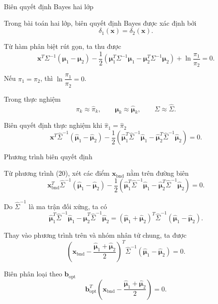 \documentclass{beamer}
\def\bsx{\bm{x}}
\begin{document}
\begin{frame}{Biên quyết định Bayes hai lớp}
	\small
	
	Trong bài toán hai lớp, biên quyết định Bayes được xác định bởi
	\[
	\delta_1(\bsx)=\delta_2(\bsx). \tag{18}
	\]
	
	Từ hàm phân biệt rút gọn, ta thu được
	\[
	\bsx^T\Sigma^{-1}(\bm{\mu}_1-\bm{\mu}_2)
	-\frac{1}{2}
	\left(
	\bm{\mu}_1^T\Sigma^{-1}\bm{\mu}_1
	-
	\bm{\mu}_2^T\Sigma^{-1}\bm{\mu}_2
	\right)
	+
	\ln\frac{\pi_1}{\pi_2}
	=0. \tag{19}
	\]
	
	Nếu \(\pi_1=\pi_2\), thì \(\ln\dfrac{\pi_1}{\pi_2}=0\).
	
	Trong thực nghiệm
	\[
	\pi_k \approx \widehat{\pi}_k,\qquad
	\bm{\mu}_k \approx \widehat{\bm{\mu}}_k,\qquad
	\Sigma \approx \widehat{\Sigma}.
	\]
	
	\begin{block}{Biên quyết định thực nghiệm khi \(\widehat{\pi}_1=\widehat{\pi}_2\)}
		\[
		\bsx^T\widehat{\Sigma}^{-1}
		(\widehat{\bm{\mu}}_1-\widehat{\bm{\mu}}_2)
		-
		\frac{1}{2}
		\left(
		\widehat{\bm{\mu}}_1^T\widehat{\Sigma}^{-1}\widehat{\bm{\mu}}_1
		-
		\widehat{\bm{\mu}}_2^T\widehat{\Sigma}^{-1}\widehat{\bm{\mu}}_2
		\right)
		=0. \tag{20}
		\]
	\end{block}
\end{frame}

\begin{frame}{Phương trình biên quyết định}
	\small
	\setlength{\abovedisplayskip}{2pt}
	\setlength{\belowdisplayskip}{2pt}
	
	Từ phương trình (20), xét các điểm \(\bsx_{\text{bnd}}\) nằm trên đường biên
	\[
	\bsx_{\text{bnd}}^T\widehat{\Sigma}^{-1}(\widehat{\bm{\mu}}_1-\widehat{\bm{\mu}}_2)
	- \frac{1}{2} \left( \widehat{\bm{\mu}}_1^T\widehat{\Sigma}^{-1}\widehat{\bm{\mu}}_1 - \widehat{\bm{\mu}}_2^T\widehat{\Sigma}^{-1}\widehat{\bm{\mu}}_2 \right) = 0.
	\]
	
	Do \(\widehat{\Sigma}^{-1}\) là ma trận đối xứng, ta có
	\[
	\widehat{\bm{\mu}}_1^T\widehat{\Sigma}^{-1}\widehat{\bm{\mu}}_1 - \widehat{\bm{\mu}}_2^T\widehat{\Sigma}^{-1}\widehat{\bm{\mu}}_2
	=
	(\widehat{\bm{\mu}}_1 + \widehat{\bm{\mu}}_2)^T \widehat{\Sigma}^{-1} (\widehat{\bm{\mu}}_1 - \widehat{\bm{\mu}}_2).
	\]
	
	Thay vào phương trình trên và nhóm nhân tử chung, ta được
	\[
	\left( \bm{x}_{\text{bnd}} - \frac{\widehat{\bm{\mu}}_1 + \widehat{\bm{\mu}}_2}{2} \right)^T \widehat{\Sigma}^{-1} (\widehat{\bm{\mu}}_1 - \widehat{\bm{\mu}}_2) = 0.
	\]
	
	\vspace{-1.5mm} %
	\begin{block}{Biên phân loại theo \(\bm{b}_{\text{opt}}\)}
		\[
		\bm{b}_{\text{opt}}^T \left( \bsx_{\text{bnd}} - \frac{\widehat{\bm{\mu}}_1 + \widehat{\bm{\mu}}_2}{2} \right) = 0.
		\]
	\end{block}
\end{frame}
\end{document}
